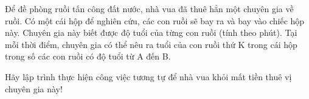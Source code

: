 Để đề phòng ruồi tấn công đất nước, nhà vua đã thuê hẳn một chuyên gia về ruồi. Có một cái hộp để nghiên cứu, các con ruồi sẽ bay ra và bay vào chiếc hộp này. Chuyên gia này biết được độ tuổi của từng con ruồi (tính theo phút). Tại mỗi thời điểm, chuyên gia có thể nêu ra tuổi của con ruồi thứ K trong cái hộp trong số các con ruồi có độ tuổi từ A đến B.  

   Hãy lập trình thực hiện công việc tương tự để nhà vua khỏi mất tiền thuê vị chuyên gia này!